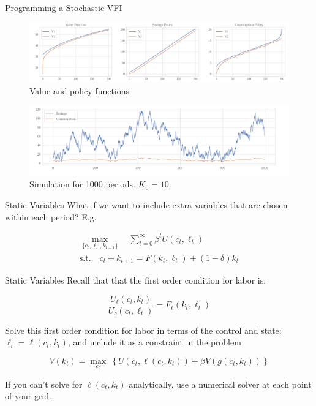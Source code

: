 \documentclass[11pt, xcolor={dvipsnames}, hyperref={colorlinks, allcolors=Blue}]{beamer}
\begin{document}
\begin{frame}{Programming a Stochastic VFI}

\begin{figure}
	\centering
	\includegraphics[width=\textwidth]{Chart2.png}
	\caption{Value and policy functions}
\end{figure}
\begin{figure}
	\centering
	\includegraphics[width=\textwidth]{Chart3.png}
	\caption{Simulation for 1000 periods. $K_0 = 10$.}
\end{figure}

\end{frame}

\begin{frame}{Static Variables}
What if we want to include extra variables that are chosen within each period? E.g.\bigskip

\begin{gather*}
\underset{\{c_{t}, \ell_{t}, k_{t+1}\}}{\max} \quad \sum_{t=0}^{\infty} \beta^{t} U(c_{t}, \ell_{t}) \\
\text{s.t.}\quad c_{t} + k_{t+1} = F(k_{t}, \ell_{t}) + (1-\delta)k_{t}
\end{gather*}
\end{frame}

\begin{frame}{Static Variables}
Recall that that the first order condition for labor is:\medskip

\[\frac{U_{\ell}(c_{t}, k_{t})}{U_{c}(c_{t}, \ell_{t})} = F_{\ell}(k_{t}, \ell_{t})\]
\bigskip

Solve this first order condition for labor in terms of the control and state: $\ell_{t} = \ell(c_{t}, k_{t})$, and include it as a constraint in the problem\medskip

\[V(k_{t}) = \underset{c_{t}}{\max} \ \left\{  U(c_{t}, \ell(c_{t}, k_{t})) + \beta V\left( g(c_{t}, k_{t})\right)  \right\} \]\medskip

If you can't solve for $\ell(c_{t}, k_{t})$ analytically, use a numerical solver at each point of your grid.
\end{frame}
\end{document}
